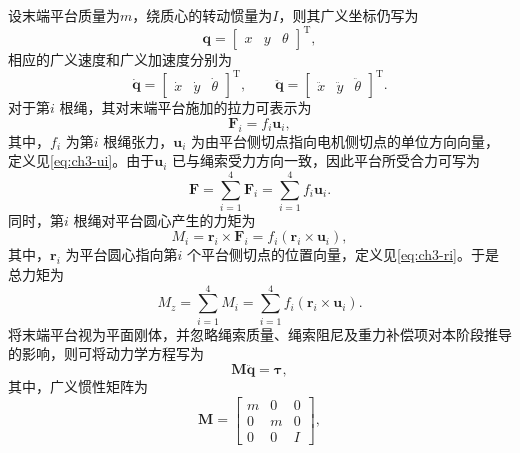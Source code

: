 设末端平台质量为$m$，绕质心的转动惯量为$I$，则其广义坐标仍写为
\begin{equation}
  \bm q= \begin{bmatrix} x & y & \theta \end{bmatrix}^{\mathrm T},
\end{equation}
相应的广义速度和广义加速度分别为
\begin{equation}
  \dot{\bm q}=
  \begin{bmatrix}
    \dot{x} & \dot{y} & \dot{\theta}
  \end{bmatrix}^{\mathrm T},\qquad
  \ddot{\bm q}=
  \begin{bmatrix}
    \ddot{x} & \ddot{y} & \ddot{\theta}
  \end{bmatrix}^{\mathrm T}.
\end{equation}
对于第$i$ 根绳，其对末端平台施加的拉力可表示为
\begin{equation}
  \bm F_i=f_i\bm u_i, \label{eq:ch3-force-i}
\end{equation}
其中，$f_i$ 为第$i$ 根绳张力，$\bm u_i$ 为由平台侧切点指向电机侧切点的单位方向向量，定义见\cref{eq:ch3-ui}。由于$\bm u_i$ 已与绳索受力方向一致，因此平台所受合力可写为
\begin{equation}
  \bm F=\sum_{i=1}^{4} \bm F_i =\sum_{i=1}^{4} f_i\bm u_i. \label{eq:ch3-total-force}
\end{equation}
同时，第$i$ 根绳对平台圆心产生的力矩为
\begin{equation}
  M_i=\bm r_i\times\bm F_i =f_i(\bm r_i\times\bm u_i), \label{eq:ch3-moment-i}
\end{equation}
其中，$\bm r_i$ 为平台圆心指向第$i$ 个平台侧切点的位置向量，定义见\cref{eq:ch3-ri}。于是总力矩为
\begin{equation}
  M_z=\sum_{i=1}^{4} M_i =\sum_{i=1}^{4} f_i(\bm r_i\times\bm u_i). \label{eq:ch3-total-moment}
\end{equation}
将末端平台视为平面刚体，并忽略绳索质量、绳索阻尼及重力补偿项对本阶段推导的影响，则可将动力学方程写为
\begin{equation}
  \bm M\ddot{\bm q}=\bm \tau, \label{eq:ch3-dynamics-basic}
\end{equation}
其中，广义惯性矩阵为
\begin{equation}
  \bm M=
  \begin{bmatrix}
    m & 0 & 0 \\
    0 & m & 0 \\
    0 & 0 & I
  \end{bmatrix},
  \label{eq:ch3-mass-matrix}
\end{equation}
